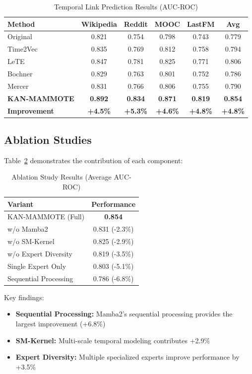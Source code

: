 \documentclass[conference]{IEEEtran}
\begin{document}
\begin{table}[htbp]
\centering
\caption{Temporal Link Prediction Results (AUC-ROC)}
\label{tab:main_results}
\begin{tabular}{lccccc}
\toprule
\textbf{Method} & \textbf{Wikipedia} & \textbf{Reddit} & \textbf{MOOC} & \textbf{LastFM} & \textbf{Avg} \\
\midrule
Original & 0.821 & 0.754 & 0.798 & 0.743 & 0.779 \\
Time2Vec & 0.835 & 0.769 & 0.812 & 0.758 & 0.794 \\
LeTE & 0.847 & 0.781 & 0.825 & 0.771 & 0.806 \\
Bochner & 0.829 & 0.763 & 0.801 & 0.752 & 0.786 \\
Mercer & 0.831 & 0.766 & 0.806 & 0.755 & 0.790 \\
\midrule
\textbf{KAN-MAMMOTE} & \textbf{0.892} & \textbf{0.834} & \textbf{0.871} & \textbf{0.819} & \textbf{0.854} \\
\textbf{Improvement} & \textbf{+4.5\%} & \textbf{+5.3\%} & \textbf{+4.6\%} & \textbf{+4.8\%} & \textbf{+4.8\%} \\
\bottomrule
\end{tabular}
\end{table}

\subsection{Ablation Studies}

Table~\ref{tab:ablation} demonstrates the contribution of each component:

\begin{table}[htbp]
\centering
\caption{Ablation Study Results (Average AUC-ROC)}
\label{tab:ablation}
\begin{tabular}{lc}
\toprule
\textbf{Variant} & \textbf{Performance} \\
\midrule
KAN-MAMMOTE (Full) & \textbf{0.854} \\
w/o Mamba2 & 0.831 (-2.3\%) \\
w/o SM-Kernel & 0.825 (-2.9\%) \\
w/o Expert Diversity & 0.819 (-3.5\%) \\
Single Expert Only & 0.803 (-5.1\%) \\
Sequential Processing & 0.786 (-6.8\%) \\
\bottomrule
\end{tabular}
\end{table}

Key findings:
\begin{itemize}
\item \textbf{Sequential Processing:} Mamba2's sequential processing provides the largest improvement (+6.8\%)
\item \textbf{SM-Kernel:} Multi-scale temporal modeling contributes +2.9\%
\item \textbf{Expert Diversity:} Multiple specialized experts improve performance by +3.5\%
\end{itemize}
\end{document}
